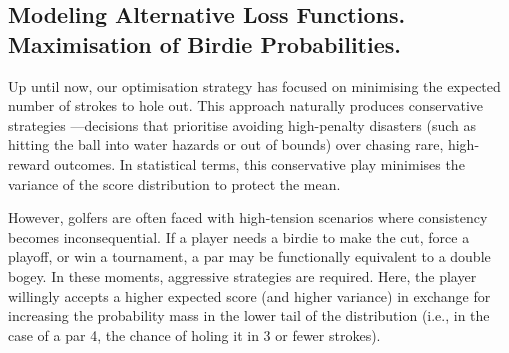 \documentclass[11pt, letterpaper]{article}
\begin{document}
    

\subsection{Modeling Alternative Loss Functions. Maximisation of Birdie Probabilities.}
\label{subsec: par4b}

Up until now, our optimisation strategy has focused on minimising the expected number of strokes to hole out. This approach naturally produces conservative strategies ---decisions that prioritise avoiding high-penalty disasters (such as hitting the ball into water hazards or out of bounds) over chasing rare, high-reward outcomes. In statistical terms, this conservative play minimises the variance of the score distribution to protect the mean.

However, golfers are often faced with high-tension scenarios where consistency becomes inconsequential. If a player needs a birdie to make the cut, force a playoff, or win a tournament, a par may be functionally equivalent to a double bogey. In these moments, aggressive strategies are required. Here, the player willingly accepts a higher expected score (and higher variance) in exchange for increasing the probability mass in the lower tail of the distribution (i.e., in the case of a par 4, the chance of holing it in 3 or fewer strokes).
\end{document}
